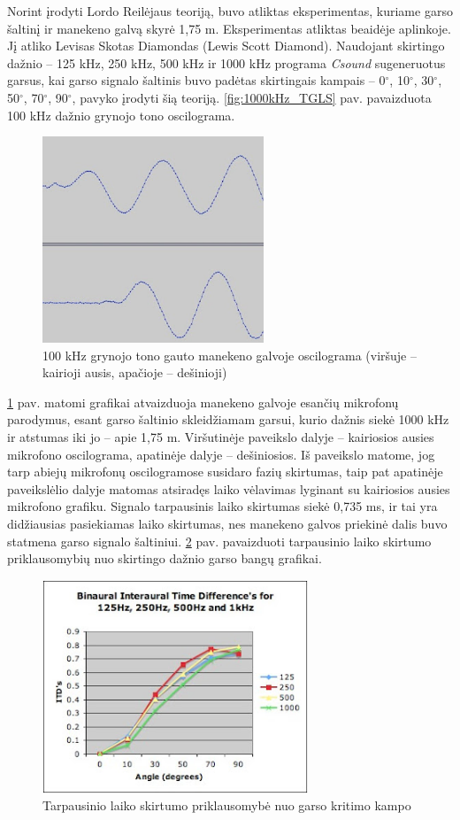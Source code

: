 \documentclass[]{vgtuef}
\begin{document}
Norint įrodyti Lordo Reilėjaus teoriją, buvo atliktas eksperimentas, kuriame garso šaltinį ir manekeno galvą skyrė 1,75 m. Eksperimentas atliktas beaidėje aplinkoje. Jį atliko Levisas Skotas Diamondas (Lewis Scott Diamond).  Naudojant skirtingo dažnio – 125 kHz, 250 kHz, 500 kHz ir 1000 kHz programa \textit{Csound} sugeneruotus garsus, kai garso signalo šaltinis buvo padėtas skirtingais kampais – 0$^\circ$, 10$^\circ$, 30$^\circ$, 50$^\circ$, 70$^\circ$, 90$^\circ$, pavyko įrodyti šią teoriją. \ref{fig:1000kHz_TGLS} pav. pavaizduota 100 kHz dažnio grynojo tono oscilograma.

\begin{figure}[!ht]
  \centering
  \includegraphics[width=250px]{img/100kHz_grynas.png}
  \caption{100 kHz grynojo tono gauto manekeno galvoje oscilograma (viršuje – kairioji ausis, apačioje – dešinioji)}
  \label{fig:100kHz_grynas}
\end{figure}

\ref{fig:100kHz_grynas} pav. matomi grafikai atvaizduoja manekeno galvoje esančių mikrofonų parodymus, esant garso šaltinio skleidžiamam garsui, kurio dažnis siekė 1000 kHz ir atstumas iki jo – apie 1,75 m. Viršutinėje paveikslo dalyje – kairiosios ausies mikrofono oscilograma, apatinėje dalyje – dešiniosios. Iš paveikslo matome, jog tarp abiejų mikrofonų oscilogramose susidaro fazių skirtumas, taip pat apatinėje paveikslėlio dalyje matomas atsiradęs laiko vėlavimas lyginant su kairiosios ausies mikrofono grafiku. Signalo tarpausinis laiko skirtumas siekė 0,735 ms, ir tai yra didžiausias pasiekiamas laiko skirtumas, nes manekeno galvos priekinė dalis buvo statmena garso signalo šaltiniui. \ref{fig:TLS_degree} pav. pavaizduoti tarpausinio laiko skirtumo priklausomybių nuo skirtingo dažnio garso bangų grafikai.

\begin{figure}[!ht]
  \centering
  \includegraphics[width=300px]{img/TLS_degree.png}
  \caption{Tarpausinio laiko skirtumo priklausomybė nuo garso kritimo kampo}
  \label{fig:TLS_degree}
\end{figure}
\end{document}
